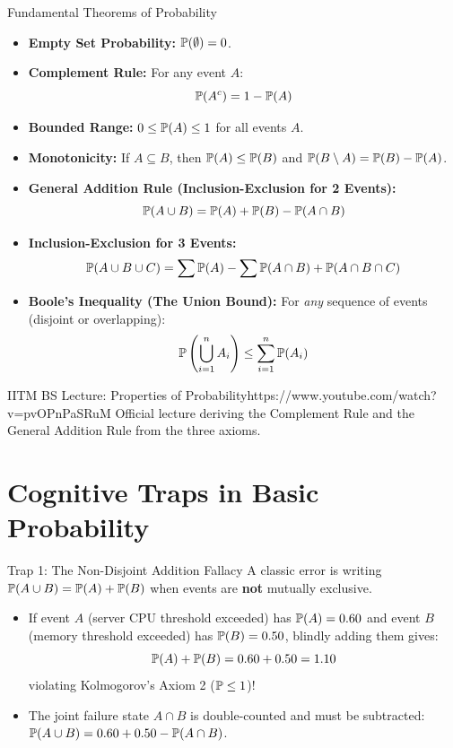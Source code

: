 \begin{theorembox}{Fundamental Theorems of Probability}
\begin{itemize}
    \item \textbf{Empty Set Probability:} $\P(\emptyset) = 0$.
    \item \textbf{Complement Rule:} For any event $A$:
    $$\P(A^c) = 1 - \P(A)$$
    \item \textbf{Bounded Range:} $0 \le \P(A) \le 1$ for all events $A$.
    \item \textbf{Monotonicity:} If $A \subseteq B$, then $\P(A) \le \P(B)$ and $\P(B \setminus A) = \P(B) - \P(A)$.
    \item \textbf{General Addition Rule (Inclusion-Exclusion for 2 Events):}
    $$\P(A \cup B) = \P(A) + \P(B) - \P(A \cap B)$$
    \item \textbf{Inclusion-Exclusion for 3 Events:}
    $$\P(A \cup B \cup C) = \sum \P(A) - \sum \P(A \cap B) + \P(A \cap B \cap C)$$
    \item \textbf{Boole's Inequality (The Union Bound):} For \emph{any} sequence of events (disjoint or overlapping):
    $$\P\left(\bigcup_{i=1}^n A_i\right) \le \sum_{i=1}^n \P(A_i)$$
\end{itemize}
\end{theorembox}

\begin{videocard}{IITM BS Lecture: Properties of Probability}{https://www.youtube.com/watch?v=pvOPnPaSRuM}
Official lecture deriving the Complement Rule and the General Addition Rule from the three axioms.
\end{videocard}

\section{Cognitive Traps in Basic Probability}

\begin{trapbox}{Trap 1: The Non-Disjoint Addition Fallacy}
A classic error is writing $\P(A \cup B) = \P(A) + \P(B)$ when events are \textbf{not} mutually exclusive.
\begin{itemize}
    \item If event $A$ (server CPU threshold exceeded) has $\P(A) = 0.60$ and event $B$ (memory threshold exceeded) has $\P(B) = 0.50$, blindly adding them gives:
    $$\P(A) + \P(B) = 0.60 + 0.50 = 1.10$$
    violating Kolmogorov's Axiom 2 ($\P \le 1$)!
    \item The joint failure state $A \cap B$ is double-counted and must be subtracted: $\P(A \cup B) = 0.60 + 0.50 - \P(A \cap B)$.
\end{itemize}
\end{trapbox}


